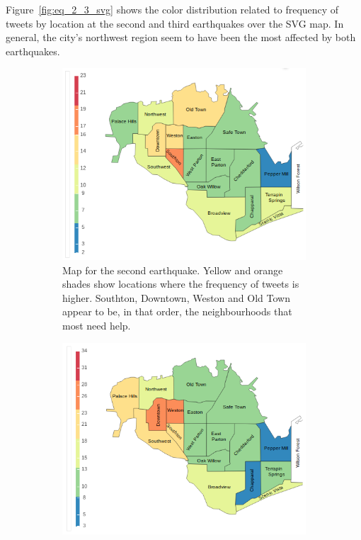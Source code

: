 Figure~\ref{fig:eq_2_3_svg} shows the color distribution related to frequency of
tweets by location at the second and third earthquakes over the SVG map. In 
general, the city's northwest region seem to have been the most affected by both 
earthquakes.

\begin{figure}[!h]
    \centering
    \begin{subfigure}[!h]{0.46\textwidth}
        \centering
        \includegraphics[width=1.00\textwidth]{figs/q2/eq_2_svg.png}
        \caption{Map for the second earthquake. Yellow and orange shades show
        locations where the frequency of tweets is higher. Southton, Downtown,
        Weston and Old Town appear to be, in that order, the neighbourhoods that 
        most need help.}
        \label{fig:eq_2_svg}
    \end{subfigure}
    \hspace{0.75cm}
    \begin{subfigure}[!h]{0.46\textwidth}
        \centering
        \includegraphics[width=1.00\textwidth]{figs/q2/eq_3_svg.png}

\end{subfigure}
\end{figure}
